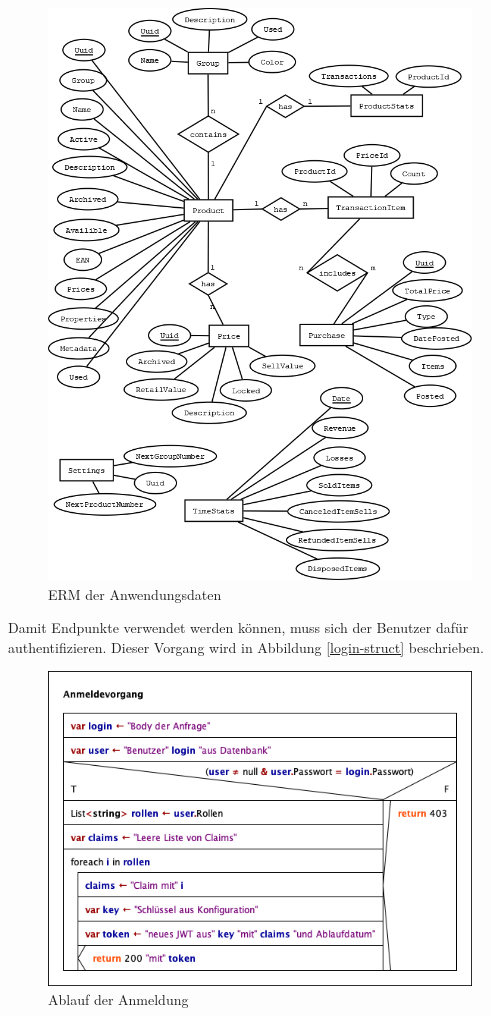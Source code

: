 \begin{figure}[ht]
	\centering
	\includegraphics[width=1\linewidth]{ERM.png}
	\caption{ERM der Anwendungsdaten}
	\label{data-erm}
\end{figure}

Damit Endpunkte verwendet werden können, muss sich der Benutzer dafür authentifizieren. 
Dieser Vorgang wird in Abbildung \vref{login-struct} beschrieben.

\begin{figure}[ht]
	\centering
	\includegraphics[width=0.7\linewidth]{Anmeldevorgang.png}
	\caption{Ablauf der Anmeldung}
	\label{login-struct}
\end{figure}
